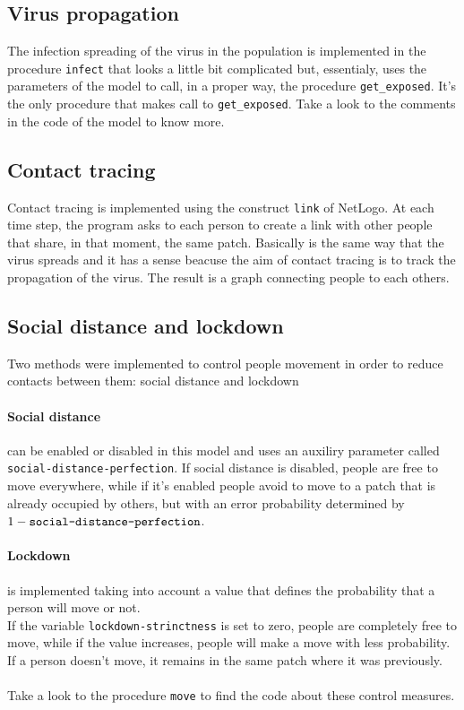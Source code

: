 \documentclass[12pt]{llncs}
\begin{document}
\subsection{Virus propagation}
The infection spreading of the virus in the population is implemented in the procedure \texttt{infect} that looks a little bit complicated but, essentialy, uses the parameters of the model to call, in a proper way, the procedure \texttt{get\_exposed}. It's the only procedure that makes call to \texttt{get\_exposed}. Take a look to the comments in the code of the model to know more.

\subsection{Contact tracing}
Contact tracing is implemented using the construct \texttt{link} of NetLogo. At each time step, the program asks to each person to create a link with other people that share, in that moment, the same patch. Basically is the same way that the virus spreads and it has a sense beacuse the aim of contact tracing is to track the propagation of the virus. The result is a graph connecting people to each others.

\subsection{Social distance and lockdown}
Two methods were implemented to control people movement in order to reduce contacts between them: social distance and lockdown
\paragraph{Social distance} can be enabled or disabled in this model and uses an auxiliry parameter called \texttt{social-distance-perfection}. If social distance is disabled, people are free to move everywhere, while if it's enabled people avoid to move to a patch that is already occupied by others, but with an error probability determined by $1 - \textrm{\texttt{social-distance-perfection}}$.
\paragraph{Lockdown} is implemented taking into account a value that defines the probability that a person will move or not. \\
If the variable \texttt{lockdown-strinctness} is set to zero, people are completely free to move, while if the value increases, people will make a move with less probability. If a person doesn't move, it remains in the same patch where it was previously.\\ \\
Take a look to the procedure \texttt{move} to find the code about these control measures.
\end{document}

